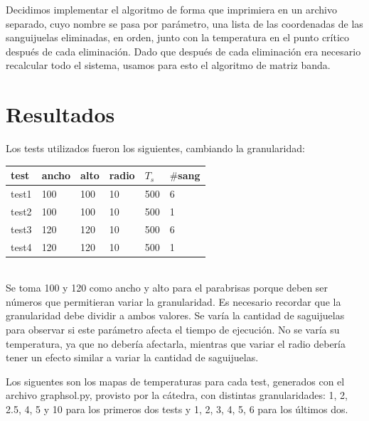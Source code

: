 \documentclass[a4paper]{article}
\begin{document}
Decidimos implementar el algoritmo de forma que imprimiera en un archivo separado, cuyo nombre se pasa por parámetro, una lista de las coordenadas de las sanguijuelas eliminadas, en orden, junto con la temperatura en el punto crítico después de cada eliminación. Dado que después de cada eliminación era necesario recalcular todo el sistema, usamos para esto el algoritmo de matriz banda. \newline \newline

\newpage

\section{Resultados}
\label{sec:res}

Los tests utilizados fueron los siguientes, cambiando la granularidad: \\
\begin{tabular}{ l|l l l l l}
  test & ancho & alto & radio & $T_s$ & $\#$sang \\
  \hline
  test1 & 100 & 100 & 10 & 500 & 6 \\
  test2 & 100 & 100 & 10 & 500 & 1 \\
  test3 & 120 & 120 & 10 & 500 & 6 \\
  test4 & 120 & 120 & 10 & 500 & 1 
\end{tabular}   \\
Se toma 100 y 120 como ancho y alto para el parabrisas porque deben ser números que permitieran variar la granularidad. Es necesario recordar que la granularidad debe dividir a ambos valores. Se varía la cantidad de saguijuelas para observar si este parámetro afecta el tiempo de ejecución. No se varía su temperatura, ya que no debería afectarla, mientras que variar el radio debería tener un efecto similar a variar la cantidad de saguijuelas.
  
Los siguentes son los mapas de temperaturas para cada test, generados con el archivo graphsol.py, provisto por la cátedra, con distintas granularidades: 1, 2, 2.5, 4, 5 y 10 para los primeros dos tests y 1, 2, 3, 4, 5, 6 para los últimos dos.
\end{document}
